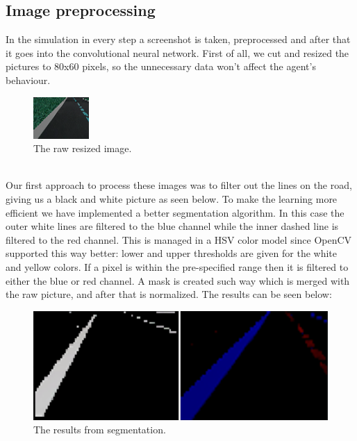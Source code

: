 \documentclass{article}
\begin{document}
\subsection{Image preprocessing}
In the simulation in every step a screenshot is taken, preprocessed and after that it goes
into the convolutional neural network. First of all, we cut and resized the
pictures to 80x60 pixels, so the unnecessary data won't affect the agent's behaviour.
\begin{figure}[h]
  \centering
  \includegraphics[scale=1.9]{fig2.png}
  \caption{The raw resized image.}
\end{figure}
\\
Our first approach to process these images was to
filter out the lines on the road, giving us a black and white picture as seen below.
To make the learning more efficient we have implemented a better segmentation algorithm.
In this case the outer white lines are filtered to the blue channel while the inner dashed
line is filtered to the red channel. This is managed in a HSV color model since OpenCV
supported this way better: lower and upper thresholds are given for the white and yellow
colors.\cite{CHOW197261,HARALICK1985100} If a pixel is within the pre-specified range then it is filtered to either the
blue or red channel. A mask is created such way which is merged with the raw picture,
and after that is normalized. The results can be seen below:
\begin{figure}[h]
  \centering
  \includegraphics[scale=0.3]{fig1.png}
  \caption{The results from segmentation.}
\end{figure}
\end{document}
